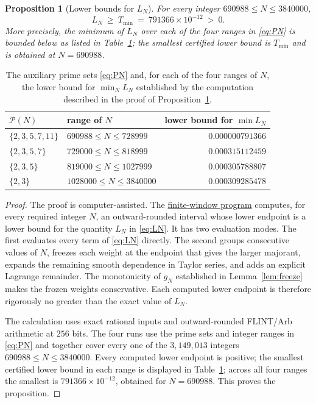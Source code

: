 \documentclass[11pt]{article}
\newtheorem{proposition}[theorem]{Proposition}
\theoremstyle{definition}
\newcommand{\calP}{\mathcal{P}}
\newcommand{\programlink}[2]{\href{https://github.com/judegomila/dbn-lambda-01787854-candidate-audit/blob/6222740efae58d773a70ff929cf12a34932d2af0/#1}{#2}}
\begin{document}
\begin{proposition}[Lower bounds for $L_N$]\label{prop:finitewindows}
For every integer $690988\le N\le3840000$,
\[
L_N\ \ge\ T_{\min}\ =\ 791366\times10^{-12}\ >\ 0 .
\]
More precisely, the minimum of $L_N$ over each of the four ranges in
\eqref{eq:PN} is bounded below as listed in
Table~\ref{tab:primesets}; the smallest certified lower bound is
$T_{\min}$ and is obtained at $N=690988$.
\end{proposition}

\begin{table}[ht!]
\centering
\begin{tabular}{@{}llr@{}}
\toprule
$\calP(N)$ & range of $N$ & lower bound for $\min L_N$\\
\midrule
$\{2,3,5,7,11\}$ & $690988\le N\le728999$ & $0.000000791366$\\
$\{2,3,5,7\}$    & $729000\le N\le818999$ & $0.000315112459$\\
$\{2,3,5\}$      & $819000\le N\le1027999$ & $0.000305788807$\\
$\{2,3\}$        & $1028000\le N\le3840000$ & $0.000309285478$\\
\bottomrule
\end{tabular}
\caption{The auxiliary prime sets \eqref{eq:PN} and, for each of the
four ranges of $N$, the lower bound for $\min_N L_N$
established by the computation described in the proof of
Proposition~\ref{prop:finitewindows}.}
\label{tab:primesets}
\end{table}
\FloatBarrier

\begin{proof}
The proof is computer-assisted.  The
\programlink{independent/prop43/prop43_proof.c}{finite-window program}
computes, for every required integer $N$, an outward-rounded interval whose
lower endpoint is a lower bound for the quantity $L_N$ in \eqref{eq:LN}.
It has two evaluation modes.  The first evaluates every term of
\eqref{eq:LN} directly.  The second groups consecutive values of $N$, freezes
each weight at the endpoint that gives the larger majorant, expands the
remaining smooth dependence in Taylor series, and adds an explicit Lagrange
remainder.  The monotonicity of $g_N$ established in
Lemma~\ref{lem:freeze} makes the frozen weights conservative.  Each computed
lower endpoint is therefore rigorously no greater than the exact value of
$L_N$.

The calculation uses exact rational inputs and outward-rounded FLINT/Arb
arithmetic at $256$ bits.  The four runs use the prime sets and integer ranges
in \eqref{eq:PN} and together cover every one of the $3{,}149{,}013$ integers
$690988\le N\le3840000$.  Every computed lower endpoint is positive; the
smallest certified lower bound in each range is displayed in
Table~\ref{tab:primesets}; across all four ranges the smallest is
$791366\times10^{-12}$, obtained for $N=690988$.  This proves the
proposition.
\end{proof}
\end{document}
